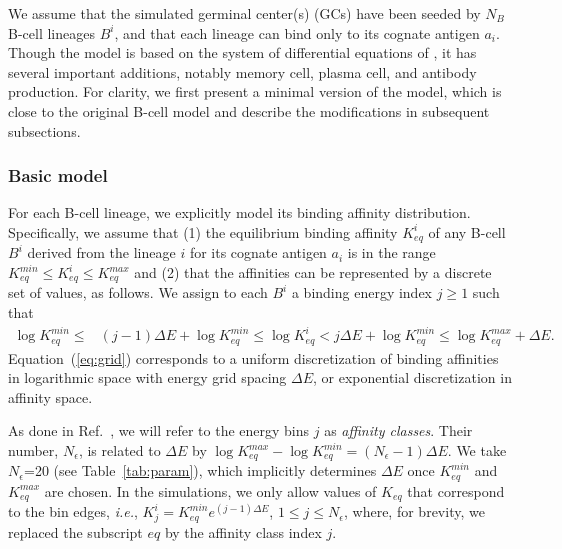 \documentclass[utf8]{frontiersHLTH}%
\newcommand{\vo}[1]{#1} %
\def\ie {{\it i.e.}}
\newcommand{\Eq}[1] {Equation~(\ref{eq:#1})}
\newcommand{\fig}[1]{Fig.~\ref{fig:#1}}
\newcommand{\tab}[1]{Table~\ref{tab:#1}}
\newcommand{\hide}[1]{}
\begin{document}
We assume that the simulated germinal center(s) (GCs) have been seeded by
$N_B$ B-cell lineages $B^i$, and that each lineage can bind only to its cognate
antigen $a_i$. Though the model is based on the system of differential equations
of \citet{kepler93}, it has several important additions, \vo{notably}
memory cell, plasma cell, and antibody production. For clarity, we first present
a minimal version of the model, which is close to the original B-cell model\cite{kepler93} and describe the modifications in
subsequent subsections.
\hide{A visual schematic of the model components was given in \fig{model}.}
\subsubsection{Basic model}
\label{sec:basic}
For each B-cell lineage, we explicitly
model its binding affinity distribution. Specifically, we
assume that (1) the equilibrium binding affinity $K_{eq}^i$ of any B-cell $B^i$ derived from the lineage $i$
for its cognate antigen $a_i$ is in the range $K_{eq}^{min}\le K_{eq}^i \le K_{eq}^{max}$ and (2) that the affinities
can be represented by a discrete set of values, as follows. We assign to each $B^i$ a binding energy index $j\ge1$ such that
\begin{equation}
 \begin{aligned}
 \log K^{min}_{eq}\le& (j-1)\Delta E+\log K^{min}_{eq}\le \log K_{eq}^i
               < j\Delta E + \log K^{min}_{eq}\le\log K^{max}_{eq} +\Delta E.
 \end{aligned}
 \label{eq:grid}
\end{equation}
\Eq{grid} corresponds to a uniform discretization of binding
affinities in logarithmic space with energy grid spacing $\Delta E$, or exponential
discretization in affinity space.

As done in
Ref.~, we will refer to the energy bins $j$ as
\textit{affinity classes}. Their number, $N_\epsilon$, is related to $\Delta E$ by $\log K^{max}_{eq} - \log K^{min}_{eq} =
(N_\epsilon-1)\Delta E$. We take
$N_\epsilon$=20 (see \tab{param}), which implicitly determines $\Delta E$
once $K^{min}_{eq}$ and $K^{max}_{eq}$ are chosen. In the simulations, we only
allow values of $K_{eq}$ that correspond to the bin edges, \ie,
$K^i_j=K^{min}_{eq}e^{(j-1)\Delta E}$, $1\le j\le N_\epsilon$, where,
for brevity, we replaced the subscript $eq$ by the affinity class index $j$.
\end{document}
